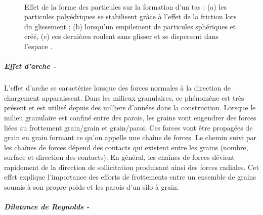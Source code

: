 				\begin{figure}\centering
					\begin{minipage}[c]{0.47\textwidth}
					\end{minipage}\hspace{0.04\textwidth}
					\begin{minipage}[c]{0.47\textwidth}
						\\
					\end{minipage}
					\caption{\label{fig03:shape_effect}Effet de la forme des particules sur la formation d'un tas : (a) les particules polyédriques se stabilisent grâce à l'effet de la friction lors du glissement ;  (b) lorsqu'un empilement de particules sphériques et créé, (c) ces dernières roulent sans glisser et se dispersent dans l'espace \citep{matuttis_understanding_2014}.}
				\end{figure}
			\subparagraph{Effet d'arche -}
				L'effet d'arche se caractérise lorsque des forces normales à la direction de chargement apparaissent. Dans les milieux granulaires, ce phénomène est très présent et est utilisé depuis des milliers d'années dans la construction. Lorsque le milieu granulaire est confiné entre des parois, les grains vont engendrer des forces liées au frottement grain/grain et grain/paroi. Ces forces vont être propagées de grain en grain formant ce qu'on appelle une chaîne de forces. Le chemin suivi par les chaînes de forces dépend des contacts qui existent entre les grains (nombre, surface et direction des contacts). En général, les chaînes de forces dévient rapidement de la direction de sollicitation produisant ainsi des forces radiales. Cet effet explique l'importance des efforts de frottements entre un ensemble de grains soumis à son propre poids et les parois d'un silo à grain.
			\subparagraph{Dilatance de Reynolds -}\label{para03:dilatance}
